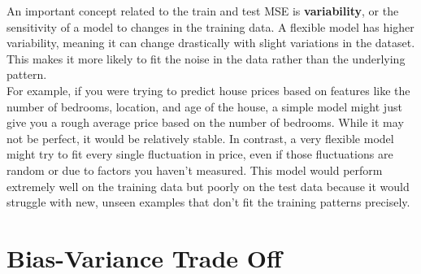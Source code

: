 \begin{center}
\end{center}

An important concept related to the train and test MSE is \textbf{variability}, or the sensitivity of a model to changes in the training data. A flexible model has higher variability, meaning it can change drastically with slight variations in the dataset. This makes it more likely to fit the noise in the data rather than the underlying pattern.\\

For example, if you were trying to predict house prices based on features like the number of bedrooms, location, and age of the house, a simple model might just give you a rough average price based on the number of bedrooms. While it may not be perfect, it would be relatively stable. In contrast, a very flexible model might try to fit every single fluctuation in price, even if those fluctuations are random or due to factors you haven’t measured. This model would perform extremely well on the training data but poorly on the test data because it would struggle with new, unseen examples that don't fit the training patterns precisely.

\section{Bias-Variance Trade Off}

